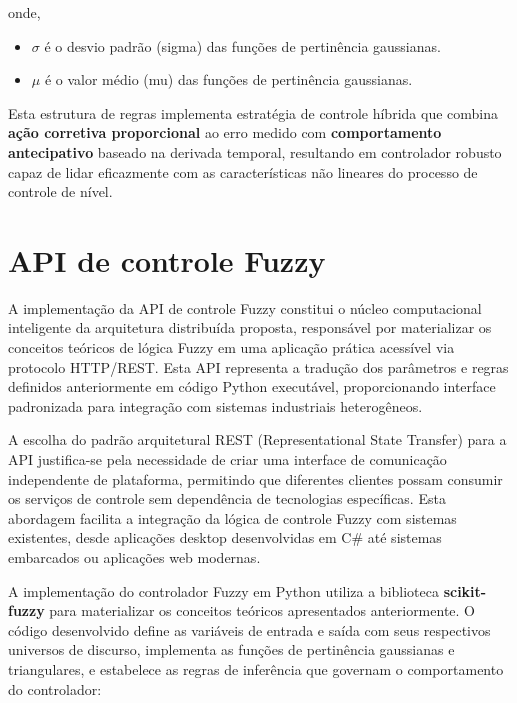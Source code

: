 onde, 

\begin{itemize}
    \item \( \sigma \) é o desvio padrão (sigma) das funções de pertinência gaussianas.
    \item \( \mu \) é o valor médio (mu) das funções de pertinência gaussianas.
\end{itemize}

Esta estrutura de regras implementa estratégia de controle híbrida que combina \textbf{ação corretiva proporcional} ao erro medido com \textbf{comportamento antecipativo} baseado na derivada temporal, resultando em controlador robusto capaz de lidar eficazmente com as características não lineares do processo de controle de nível.

\section{API de controle Fuzzy}
\label{sec:apicontrolefuzzy}

A implementação da API de controle Fuzzy constitui o núcleo computacional inteligente da arquitetura distribuída proposta, responsável por materializar os conceitos teóricos de lógica Fuzzy em uma aplicação prática acessível via protocolo HTTP/REST. Esta API representa a tradução dos parâmetros e regras definidos anteriormente em código Python executável, proporcionando interface padronizada para integração com sistemas industriais heterogêneos.

A escolha do padrão arquitetural REST (Representational State Transfer) para a API justifica-se pela necessidade de criar uma interface de comunicação independente de plataforma, permitindo que diferentes clientes possam consumir os serviços de controle sem dependência de tecnologias específicas. Esta abordagem facilita a integração da lógica de controle Fuzzy com sistemas existentes, desde aplicações desktop desenvolvidas em C\# até sistemas embarcados ou aplicações web modernas.

A implementação do controlador Fuzzy em Python utiliza a biblioteca \textbf{scikit-fuzzy} para materializar os conceitos teóricos apresentados anteriormente. O código desenvolvido define as variáveis de entrada e saída com seus respectivos universos de discurso, implementa as funções de pertinência gaussianas e triangulares, e estabelece as regras de inferência que governam o comportamento do controlador:

